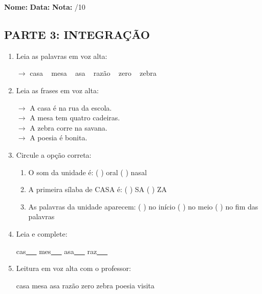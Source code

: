 \begin{exercicio}

\noindent\textbf{Nome:} \underline{\hspace{3.2cm}} \quad \textbf{Data:} \underline{\hspace{1.6cm}} \quad \textbf{Nota:} \underline{\hspace{0.9cm}}/10


\subsection*{PARTE 3: INTEGRAÇÃO}

\begin{enumerate}[resume]

  \item Leia as palavras em voz alta:
  \begin{center}
  $\rightarrow$ casa ~ mesa ~ asa ~ razão ~ zero ~ zebra
  \end{center}

  \item Leia as frases em voz alta:
  \begin{center}
  $\rightarrow$ A casa é na rua da escola.\\
  $\rightarrow$ A mesa tem quatro cadeiras.\\
  $\rightarrow$ A zebra corre na savana.\\
  $\rightarrow$ A poesia é bonita.\\
  \end{center}

  \item Circule a opção correta:
  \begin{enumerate}[label=(\alph*)]

    \item O som da unidade é: ( ) oral ( ) nasal 

    \item A primeira sílaba de CASA é: ( ) SA ( ) ZA

    \item As palavras da unidade aparecem: ( ) no início ( ) no meio ( ) no fim das palavras

  \end{enumerate}

  \item Leia e complete:
  \begin{center}
  cas\underline{~~~} \quad mes\underline{~~~} \quad asa\underline{~~~} \quad raz\underline{~~~}
  \end{center}

  \item Leitura em voz alta com o professor:
  \begin{center}
  casa \quad mesa \quad asa \quad razão \quad zero \quad zebra \quad poesia \quad visita
  \end{center}

\end{enumerate}

\end{exercicio}

